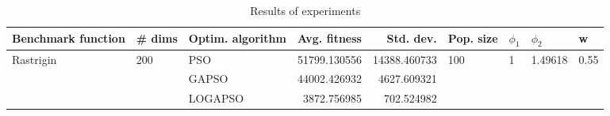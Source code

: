 \begin{table}
\centering
\caption{Results of experiments}
\begin{tabular}{lllrrllll}
\toprule
        Benchmark function &              \# dims & Optim. algorithm &  Avg. fitness &    Std. dev. &            Pop. size &         $\phi_{1}$ &               $\phi_{2}$ &                     w \\
\midrule
\multirow{3}{*}{Rastrigin} & \multirow{3}{*}{200} &              PSO &  51799.130556 & 14388.460733 & \multirow{3}{*}{100} & \multirow{3}{*}{1} & \multirow{3}{*}{1.49618} & \multirow{3}{*}{0.55} \\
                           &                      &            GAPSO &  44002.426932 &  4627.609321 &                      &                    &                          &                       \\
                           &                      &          LOGAPSO &   3872.756985 &   702.524982 &                      &                    &                          &                       \\
\bottomrule
\end{tabular}
\end{table}
